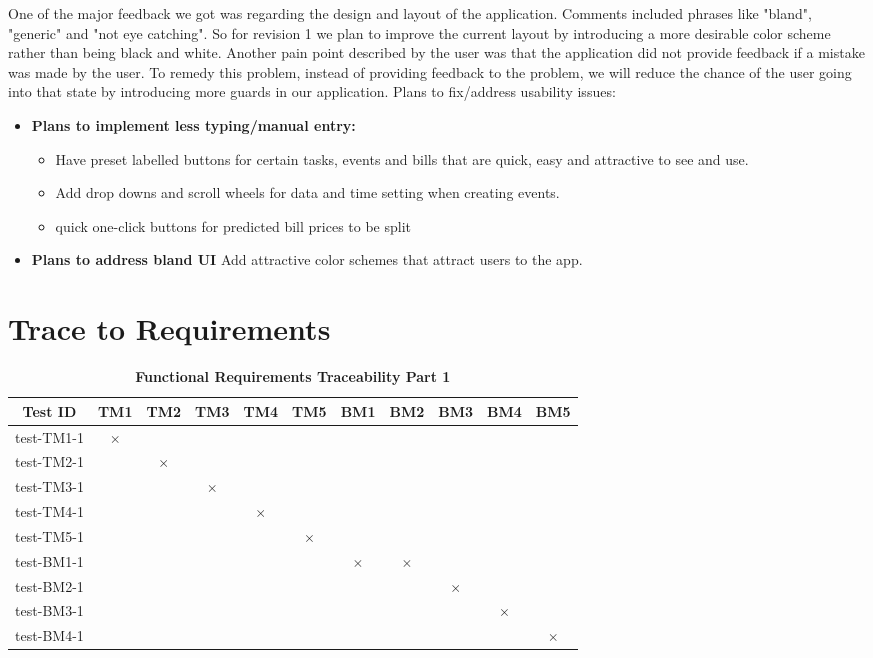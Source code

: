 \documentclass[12pt, titlepage]{article}
\begin{document}
One of the major feedback we got was regarding the design and layout of the application. Comments included phrases like "bland", "generic" and "not eye catching". So for revision 1 we plan to improve the current layout by introducing a more desirable color scheme rather than being black and white. Another pain point described by the user was that the application did not provide feedback if a mistake was made by the user. To remedy this problem, instead of providing feedback to the problem, we will reduce the chance of the user going into that state by introducing more guards in our application. 
\newline Plans to fix/address usability issues:
\begin{itemize}
 \item \textbf{Plans to implement less typing/manual entry:} 
    \begin{itemize}
    \item Have preset labelled buttons for certain tasks, events and bills that are quick, easy and attractive to see and use.
    \item Add drop downs and scroll wheels for data and time setting when creating events.
    \item quick one-click buttons for predicted bill prices to be split
    \end{itemize}
  \item \textbf{Plans to address bland UI} Add attractive color schemes that attract users to the app.
\end{itemize}

\section{Trace to Requirements}

\begin{table}[H]
\centering
\begin{tabular}{|c|c|c|c|c|c|c|c|c|c|c|}
\hline
Test ID & TM1 & TM2 & TM3 & TM4 & TM5 & BM1 & BM2 & BM3 & BM4 & BM5 \\
\hline 
test-TM1-1 & $\times$ & & & & & & & & & \\
test-TM2-1 & & $\times$ & & & & & & & & \\
test-TM3-1 & & & $\times$ & & & & & & & \\
test-TM4-1 & & & & $\times$ & & & & & & \\
test-TM5-1 & & & & & $\times$ & & & & & \\
test-BM1-1 & & & & & & $\times$ & $\times$ & & & \\
test-BM2-1 & & & & & & & & $\times$ & & \\
test-BM3-1 & & & & & & & & & $\times$ & \\
test-BM4-1 & & & & & & & & & & $\times$ \\
\hline
\end{tabular}
\caption{\bf Functional Requirements Traceability Part 1}
\end{table}
\end{document}
